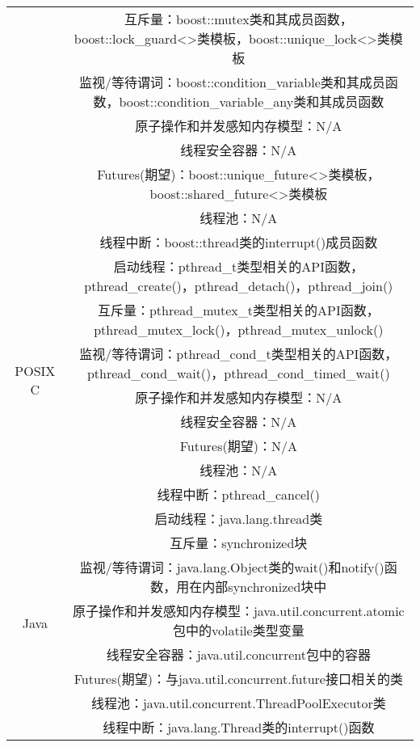 \begin{landscape}
\begin{table}[h]
\begin{adjustbox}{max width=\textwidth}
\begin{tabular}{|c|c|}
 & 互斥量：boost::mutex类和其成员函数，boost::lock\_guard<>类模板，boost::unique\_lock<>类模板 \\
 & 监视/等待谓词：boost::condition\_variable类和其成员函数，boost::condition\_variable\_any类和其成员函数 \\
 & 原子操作和并发感知内存模型：N/A \\
 & 线程安全容器：N/A \\
 & Futures(期望)：boost::unique\_future<>类模板，boost::shared\_future<>类模板 \\
 & 线程池：N/A \\
 & 线程中断：boost::thread类的interrupt()成员函数 \\
\hline
\multirow{8}{*}{POSIX C} & 启动线程：pthread\_t类型相关的API函数，pthread\_create()，pthread\_detach()，pthread\_join() \\
 & 互斥量：pthread\_mutex\_t类型相关的API函数，pthread\_mutex\_lock()，pthread\_mutex\_unlock() \\
 & 监视/等待谓词：pthread\_cond\_t类型相关的API函数，pthread\_cond\_wait()，pthread\_cond\_timed\_wait() \\
 & 原子操作和并发感知内存模型：N/A \\
 & 线程安全容器：N/A \\
 & Futures(期望)：N/A \\
 & 线程池：N/A \\
 & 线程中断：pthread\_cancel() \\
\hline
\multirow{8}{*}{Java} & 启动线程：java.lang.thread类 \\
 & 互斥量：synchronized块 \\
 & 监视/等待谓词：java.lang.Object类的wait()和notify()函数，用在内部synchronized块中 \\
 & 原子操作和并发感知内存模型：java.util.concurrent.atomic包中的volatile类型变量 \\
 & 线程安全容器：java.util.concurrent包中的容器 \\
 & Futures(期望)：与java.util.concurrent.future接口相关的类 \\
 & 线程池：java.util.concurrent.ThreadPoolExecutor类 \\
 & 线程中断：java.lang.Thread类的interrupt()函数 \\
\hline
\end{tabular}
\end{adjustbox}
\end{table}
\end{landscape}


